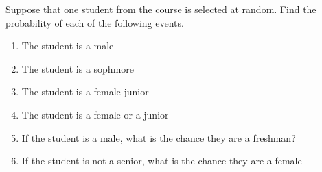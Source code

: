 \documentclass{report}
\begin{document}
\bigbreak \noindent
Suppose that one student from the course is selected at random. Find the probability of each of the following events.
\begin{enumerate}
  \item The student is a male 
  \item The student is a sophmore
  \item The student is a female junior
  \item The student is a female or a junior
  \item If the student is a male, what is the chance they are a freshman?
  \item If the student is not a senior, what is the chance they are a female
\end{enumerate}
\bigbreak \noindent \bigbreak \noindent
\pagebreak
\end{document}
